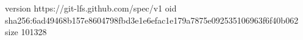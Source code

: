 version https://git-lfs.github.com/spec/v1
oid sha256:6ad49468b157e8604798fbd3e1e6efac1e179a7875e092535106963f6f40b062
size 101328

